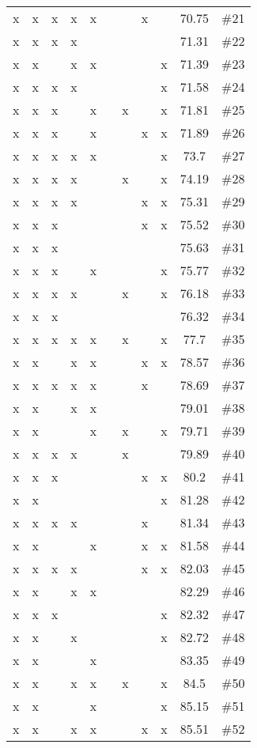 \begin{longtable}{|c|c|c|c|c|c|c|c|c|c|c|}
 x & x & x & x & x & & & x & &70.75 & \#21 \\
 x & x & x & x & & & & & &71.31 & \#22 \\
 x & x & & x & x & & & & x &71.39 & \#23 \\
 x & x & x & x & & & & & x &71.58 & \#24 \\
 x & x & x & & x & & x & & x &71.81 & \#25 \\
 x & x & x & & x & & & x & x &71.89 & \#26 \\
 x & x & x & x & x & & & & x &73.7 & \#27 \\
 x & x & x & x & & & x & & x &74.19 & \#28 \\
 x & x & x & x & & & & x & x &75.31 & \#29 \\
 x & x & x & & & & & x & x &75.52 & \#30 \\
 x & x & x & & & & & & &75.63 & \#31 \\
 x & x & x & & x & & & & x &75.77 & \#32 \\
 x & x & x & x & & & x & & x &76.18 & \#33 \\
 x & x & x & & & & & & &76.32 & \#34 \\
 x & x & x & x & x & & x & & x &77.7 & \#35 \\
 x & x & & x & x & & & x & x &78.57 & \#36 \\
 x & x & x & x & x & & & x & &78.69 & \#37 \\
 x & x & & x & x & & & & &79.01 & \#38 \\
 x & x & & & x & & x & & x &79.71 & \#39 \\
 x & x & x & x & & & x & & &79.89 & \#40 \\
 x & x & x & & & & & x & x &80.2 & \#41 \\
 x & x & & & & & & & x &81.28 & \#42 \\
 x & x & x & x & & & & x & &81.34 & \#43 \\
 x & x & & & x & & & x & x &81.58 & \#44 \\
 x & x & x & x & & & & x & x &82.03 & \#45 \\
 x & x & & x & x & & & & &82.29 & \#46 \\
 x & x & x & & & & & & x &82.32 & \#47 \\
 x & x & & x & & & & & x &82.72 & \#48 \\
 x & x & & & x & & & & &83.35 & \#49 \\
 x & x & & x & x & & x & & x &84.5 & \#50 \\
 x & x & & & x & & & & x &85.15 & \#51 \\
 x & x & & x & x & & & x & x &85.51 & \#52 \\

\end{longtable}
